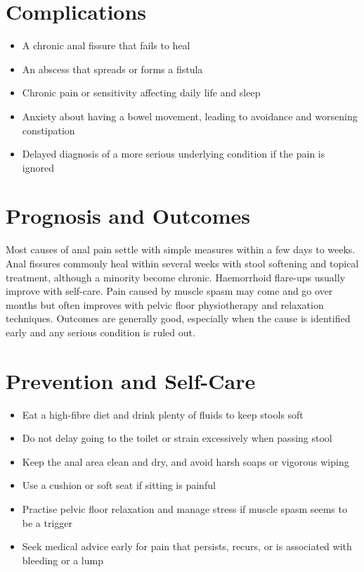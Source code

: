 \section*{Complications}
\begin{itemize}
    \item A chronic anal fissure that fails to heal
    \item An abscess that spreads or forms a fistula
    \item Chronic pain or sensitivity affecting daily life and sleep
    \item Anxiety about having a bowel movement, leading to avoidance and worsening constipation
    \item Delayed diagnosis of a more serious underlying condition if the pain is ignored
\end{itemize}

\section*{Prognosis and Outcomes}
Most causes of anal pain settle with simple measures within a few days to weeks. Anal fissures commonly heal within several weeks with stool softening and topical treatment, although a minority become chronic. Haemorrhoid flare-ups usually improve with self-care. Pain caused by muscle spasm may come and go over months but often improves with pelvic floor physiotherapy and relaxation techniques. Outcomes are generally good, especially when the cause is identified early and any serious condition is ruled out.

\section*{Prevention and Self-Care}
\begin{itemize}
    \item Eat a high-fibre diet and drink plenty of fluids to keep stools soft
    \item Do not delay going to the toilet or strain excessively when passing stool
    \item Keep the anal area clean and dry, and avoid harsh soaps or vigorous wiping
    \item Use a cushion or soft seat if sitting is painful
    \item Practise pelvic floor relaxation and manage stress if muscle spasm seems to be a trigger
    \item Seek medical advice early for pain that persists, recurs, or is associated with bleeding or a lump
\end{itemize}

